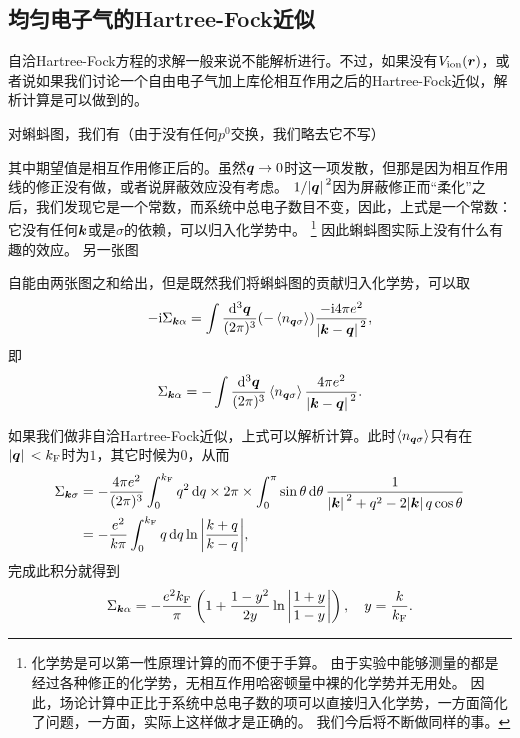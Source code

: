 \subsection{均匀电子气的Hartree-Fock近似}

自洽Hartree-Fock方程的求解一般来说不能解析进行。不过，如果没有$V_\text{ion}(\vb*{r})$，或者说如果我们讨论一个自由电子气加上库伦相互作用之后的Hartree-Fock近似，解析计算是可以做到的。

对蝌蚪图，我们有（由于没有任何$p^0$交换，我们略去它不写）

其中期望值是相互作用修正后的。虽然$\vb*{q} \to 0$时这一项发散，但那是因为相互作用线的修正没有做，或者说屏蔽效应没有考虑。
$1 / \abs*{\vb*{q}}^2$因为屏蔽修正而“柔化”之后，我们发现它是一个常数，而系统中总电子数目不变，因此，上式是一个常数：它没有任何$\vb*{k}$或是$\sigma$的依赖，可以归入化学势中。%
\footnote{
    化学势是可以第一性原理计算的而不便于手算。
    由于实验中能够测量的都是经过各种修正的化学势，无相互作用哈密顿量中裸的化学势并无用处。
    因此，场论计算中正比于系统中总电子数的项可以直接归入化学势，一方面简化了问题，一方面，实际上这样做才是正确的。
    我们今后将不断做同样的事。
}%
因此蝌蚪图实际上没有什么有趣的效应。
另一张图

自能由两张图之和给出，但是既然我们将蝌蚪图的贡献归入化学势，可以取
\[
    - \mathrm{i} \Sigma_{\vb*{k} \alpha} = \int \frac{\dd[3]{\vb*{q}}}{(2\pi)^3} (- \expval{n_{\vb*{q} \sigma}}) \frac{- \mathrm{i} 4 \pi e^2}{\abs*{\vb*{k} - \vb*{q}}^2},
\]
即
\begin{equation}
    \Sigma_{\vb*{k} \alpha} = - \int \frac{\dd[3]{\vb*{q}}}{(2\pi)^3} \expval{n_{\vb*{q} \sigma}} \frac{4 \pi e^2}{\abs*{\vb*{k} - \vb*{q}}^2}.
\end{equation}

如果我们做非自洽Hartree-Fock近似，上式可以解析计算。此时$\expval{n_{\vb*{q} \sigma}}$只有在$\abs*{\vb*{q}} < k_\text{F}$时为$1$，其它时候为$0$，从而
\[
    \begin{aligned}
        \Sigma_{\vb*{k} \sigma} &= - \frac{4\pi e^2}{(2\pi)^3} \int_0^{k_\text{F}} q^2 \dd{q} \times 2 \pi \times \int_{0}^{\pi} \sin \theta \dd{\theta} \frac{1}{\abs*{\vb*{k}}^2 + q^2 - 2 \abs*{\vb*{k}} q \cos \theta} \\
        &= - \frac{e^2}{k \pi} \int_0^{k_\text{F}} q \dd{q} \ln\abs{\frac{k+q}{k-q}},
    \end{aligned}
\]
完成此积分就得到
\begin{equation}
    \Sigma_{\vb*{k} \alpha} = - \frac{e^2 k_\text{F}}{\pi} \left( 1 + \frac{1 - y^2}{2y} \ln\abs{\frac{1+y}{1-y}} \right), \quad y = \frac{k}{k_\text{F}}.
    \label{eq:example-electron-hf-self-energy}
\end{equation}

